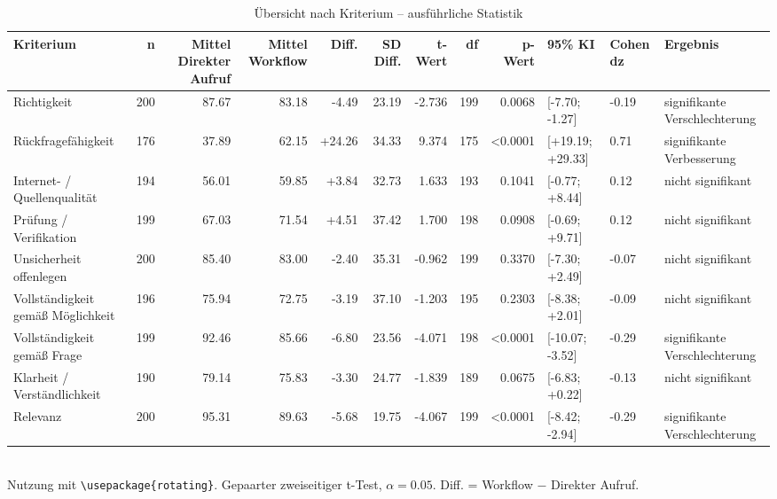 \begin{table}
\centering
\caption{Übersicht nach Kriterium -- ausführliche Statistik}
\begin{tabular}{lrrrrrrrrlll}
\toprule
Kriterium & n & Mittel Direkter Aufruf & Mittel Workflow & Diff. & SD Diff. & t-Wert & df & p-Wert & 95\% KI & Cohen dz & Ergebnis \\
\midrule
Richtigkeit & 200 & 87.67 & 83.18 & -4.49 & 23.19 & -2.736 & 199 & 0.0068 & [-7.70; -1.27] & -0.19 & signifikante Verschlechterung \\
Rückfragefähigkeit & 176 & 37.89 & 62.15 & +24.26 & 34.33 & 9.374 & 175 & <0.0001 & [+19.19; +29.33] & 0.71 & signifikante Verbesserung \\
Internet- / Quellenqualität & 194 & 56.01 & 59.85 & +3.84 & 32.73 & 1.633 & 193 & 0.1041 & [-0.77; +8.44] & 0.12 & nicht signifikant \\
Prüfung / Verifikation & 199 & 67.03 & 71.54 & +4.51 & 37.42 & 1.700 & 198 & 0.0908 & [-0.69; +9.71] & 0.12 & nicht signifikant \\
Unsicherheit offenlegen & 200 & 85.40 & 83.00 & -2.40 & 35.31 & -0.962 & 199 & 0.3370 & [-7.30; +2.49] & -0.07 & nicht signifikant \\
Vollständigkeit gemäß Möglichkeit & 196 & 75.94 & 72.75 & -3.19 & 37.10 & -1.203 & 195 & 0.2303 & [-8.38; +2.01] & -0.09 & nicht signifikant \\
Vollständigkeit gemäß Frage & 199 & 92.46 & 85.66 & -6.80 & 23.56 & -4.071 & 198 & <0.0001 & [-10.07; -3.52] & -0.29 & signifikante Verschlechterung \\
Klarheit / Verständlichkeit & 190 & 79.14 & 75.83 & -3.30 & 24.77 & -1.839 & 189 & 0.0675 & [-6.83; +0.22] & -0.13 & nicht signifikant \\
Relevanz & 200 & 95.31 & 89.63 & -5.68 & 19.75 & -4.067 & 199 & <0.0001 & [-8.42; -2.94] & -0.29 & signifikante Verschlechterung \\
\bottomrule
\end{tabular}
\\[2mm]
\footnotesize Nutzung mit \texttt{\textbackslash usepackage\{rotating\}}. Gepaarter zweiseitiger t-Test, $\alpha=0.05$. Diff. = Workflow $-$ Direkter Aufruf.
\end{table}
